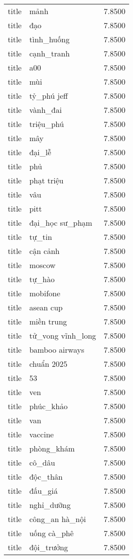 \documentclass{article}
\begin{document}
\begin{tabular}{lll}
title & mảnh & 7.8500\\
title & đạo & 7.8500\\
title & tình\_huống & 7.8500\\
title & cạnh\_tranh & 7.8500\\
title & a00 & 7.8500\\
title & mùi & 7.8500\\
title & tỷ\_phú jeff & 7.8500\\
title & vành\_đai & 7.8500\\
title & triệu\_phú & 7.8500\\
title & mây & 7.8500\\
title & đại\_lễ & 7.8500\\
title & phủ & 7.8500\\
title & phạt triệu & 7.8500\\
title & vâu & 7.8500\\
title & pitt & 7.8500\\
title & đại\_học sư\_phạm & 7.8500\\
title & tự\_tin & 7.8500\\
title & cận cảnh & 7.8500\\
title & moscow & 7.8500\\
title & tự\_hào & 7.8500\\
title & mobifone & 7.8500\\
title & asean cup & 7.8500\\
title & miền trung & 7.8500\\
title & tử\_vong vĩnh\_long & 7.8500\\
title & bamboo airways & 7.8500\\
title & chuẩn 2025 & 7.8500\\
title & 53 & 7.8500\\
title & ven & 7.8500\\
title & phúc\_khảo & 7.8500\\
title & van & 7.8500\\
title & vaccine & 7.8500\\
title & phòng\_khám & 7.8500\\
title & cô\_dâu & 7.8500\\
title & độc\_thân & 7.8500\\
title & đấu\_giá & 7.8500\\
title & nghỉ\_dưỡng & 7.8500\\
title & công\_an hà\_nội & 7.8500\\
title & uống cà\_phê & 7.8500\\
title & đội\_trưởng & 7.8500\\

\end{tabular}
\end{document}
